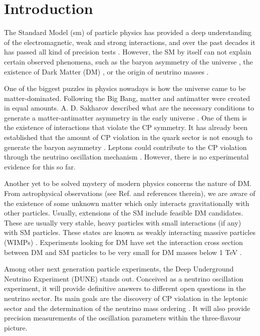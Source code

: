 \chapter{Introduction}
\label{chapter:introduction}

The Standard Model (\gls{sm}) of particle physics \cite{Glashow1961,Weinberg1967,Salam1968} has provided a deep understanding of the electromagnetic, weak and strong interactions, and over the past decades it has passed all kind of precision tests \cite{Erler2019}. However, the SM by itself can not explain certain observed phenomena, such as the baryon asymmetry of the universe \cite{Canetti2012}, the existence of Dark Matter (DM) \cite{Bertone2004}, or the origin of neutrino masses \cite{King2014}.

One of the biggest puzzles in physics nowadays is how the universe came to be matter-dominated. Following the Big Bang, matter and antimatter were created in equal amounts. A. D. Sakharov described what are the necessary conditions to generate a matter-antimatter asymmetry in the early universe \cite{Sakharov1967}. One of them is the existence of interactions that violate the CP symmetry. It has already been established that the amount of CP violation in the quark sector is not enough to generate the baryon asymmetry \cite{Gavela1993}. Leptons could contribute to the CP violation through the neutrino oscillation mechanism \cite{Akhmedov1998}. However, there is no experimental evidence for this so far.

Another yet to be solved mystery of modern physics concerns the nature of DM. From astrophysical observations (see Ref. \cite{Bertone2004} and references therein), we are aware of the existence of some unknown matter which only interacts gravitationally with other particles. Usually, extensions of the SM include feasible DM candidates. These are usually very stable, heavy particles with small interactions (if any) with SM particles. These states are known as weakly interacting massive particles (WIMPs) \cite{Lee1977,Jungman1995}. Experiments looking for DM have set the interaction cross section between DM and SM particles to be very small for DM masses below 1 TeV \cite{Arcadi2024}.

Among other next generation particle experiments, the Deep Underground Neutrino Experiment (DUNE) stands out. Conceived as a neutrino oscillation experiment, it will provide definitive answers to different open questions in the neutrino sector. Its main goals are the discovery of CP violation in the leptonic sector and the determination of the neutrino mass ordering \cite{DUNE2020TDR1}. It will also provide precision measurements of the oscillation parameters within the three-flavour picture.

